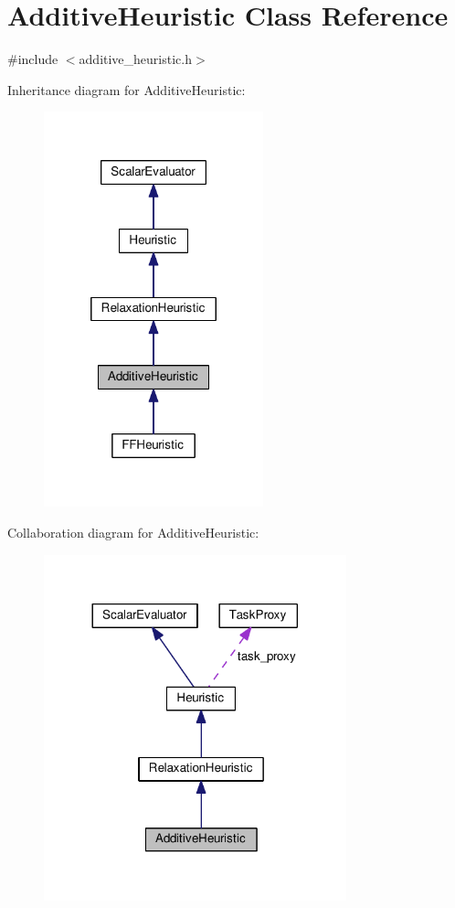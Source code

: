 \hypertarget{classAdditiveHeuristic}{\section{Additive\-Heuristic Class Reference}
\label{classAdditiveHeuristic}
}


{\ttfamily \#include $<$additive\-\_\-heuristic.\-h$>$}



Inheritance diagram for Additive\-Heuristic\-:
\nopagebreak
\begin{figure}[H]
\begin{center}
\leavevmode
\includegraphics[width=180pt]{classAdditiveHeuristic__inherit__graph}
\end{center}
\end{figure}


Collaboration diagram for Additive\-Heuristic\-:
\nopagebreak
\begin{figure}[H]
\begin{center}
\leavevmode
\includegraphics[width=248pt]{classAdditiveHeuristic__coll__graph}
\end{center}
\end{figure}

